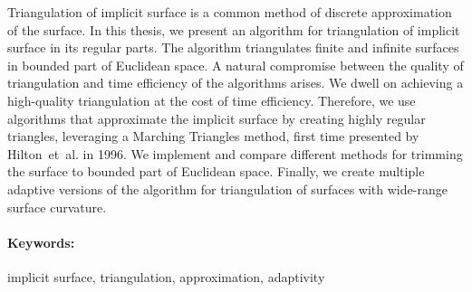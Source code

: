\documentclass[12pt, twoside]{book}
\begin{document}
Triangulation of implicit surface is a common method of discrete approximation of the surface.
In this thesis, we present an algorithm for triangulation of implicit surface in its regular 
parts. The algorithm triangulates finite and infinite surfaces in bounded part
of Euclidean space. 
A natural compromise between the quality of triangulation and time efficiency of the algorithms arises. 
We dwell on achieving a high-quality triangulation at the cost of time efficiency. Therefore, we 
use algorithms that approximate the implicit surface by creating highly regular triangles, leveraging a 
Marching Triangles method, first time presented by Hilton~et~al. in 1996. 
We implement and compare different methods for trimming the surface to bounded part of Euclidean space.
Finally, we create multiple adaptive versions of the algorithm for triangulation of surfaces 
with wide-range surface curvature.


\paragraph*{Keywords:} implicit surface, triangulation, approximation, adaptivity


%
%



\newpage 

\tableofcontents



\newpage 

\listoffigures
\listoftables


\mainmatter

\end{document}
